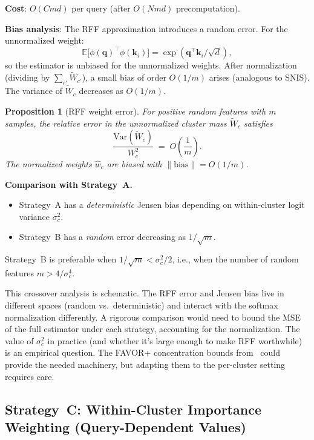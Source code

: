 \documentclass[11pt,a4paper]{article}
\newtheorem{proposition}[theorem]{Proposition}
\theoremstyle{definition}
\newcommand{\kk}{\mathbf{k}}
\newcommand{\qq}{\mathbf{q}}
\newcommand{\Var}{\mathrm{Var}}
\begin{document}
\textbf{Cost}: $O(Cmd)$ per query (after $O(Nmd)$ precomputation).

\textbf{Bias analysis}: The RFF approximation introduces a random error.
For the unnormalized weight:
\begin{equation}\label{eq:rff-error}
  \mathbb{E}\bigl[\phi(\qq)^{\!\top}\phi(\kk_i)\bigr]
  = \exp(\qq^{\!\top}\kk_i/\sqrt{d}),
\end{equation}
so the estimator is unbiased for the unnormalized weights.  After
normalization (dividing by $\sum_{c'}\tilde{W}_{c'}$), a small bias of order
$O(1/m)$ arises (analogous to SNIS).  The variance of $\tilde{W}_c$ decreases
as $O(1/m)$.

\begin{proposition}[RFF weight error]\label{prop:rff-weight}
For positive random features with $m$ samples, the relative error in the
unnormalized cluster mass $\tilde{W}_c$ satisfies
\[
  \frac{\Var(\tilde{W}_c)}{W_c^2}
  \;=\; O\!\left(\frac{1}{m}\right).
\]
The normalized weights $\hat{w}_c$ are biased with
$\|\text{bias}\| = O(1/m)$.
\end{proposition}

\textbf{Comparison with Strategy~A.}
\begin{itemize}[nosep]
  \item Strategy~A has a \emph{deterministic} Jensen bias depending on
    within-cluster logit variance $\sigma_c^2$.
  \item Strategy~B has a \emph{random} error decreasing as $1/\sqrt{m}$.
\end{itemize}

Strategy~B is preferable when $1/\sqrt{m} < \sigma_c^2/2$, i.e., when the
number of random features $m > 4/\sigma_c^4$.

\begin{researchnote}
This crossover analysis is schematic.  The RFF error and Jensen bias live in
different spaces (random vs.\ deterministic) and interact with the softmax
normalization differently.  A rigorous comparison would need to bound the MSE
of the full estimator under each strategy, accounting for the normalization.
The value of $\sigma_c^2$ in practice (and whether it's large enough to make
RFF worthwhile) is an empirical question.  The FAVOR+ concentration bounds
from~\cite{choromanski2021rethinking} could provide the needed machinery, but
adapting them to the per-cluster setting requires care.
\end{researchnote}

\subsection{Strategy~C: Within-Cluster Importance Weighting
  (Query-Dependent Values)}\label{sec:strat-wciw}
\end{document}
